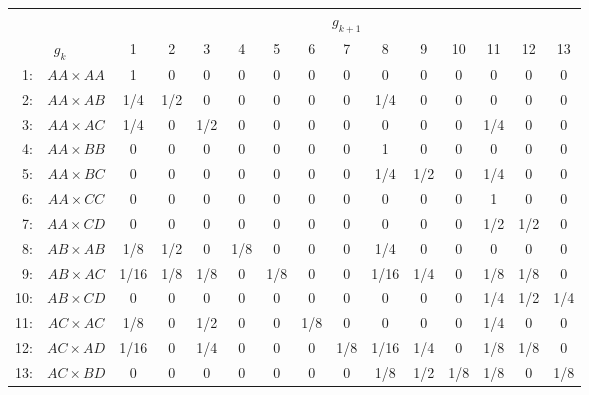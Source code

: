 \begin{center}
\begin{tabular}{rc@{\hspace{10mm}}ccccccccccccc} \hline
 && \multicolumn{13}{c}{$g_{k+1}$} \\ \cline{3-15}
\multicolumn{2}{c}{$g_k$}  & 1 & 2 & 3 & 4 & 5 & 6 & 7 & 8 & 9 & 10 & 11 & 12 & 13\\ \hline
1: & $AA \times AA$ & 1 & 0 & 0 & 0 & 0 & 0 & 0 & 0 & 0 & 0 & 0 & 0 & 0 \\ 
2: & $AA \times AB$ & 1/4 & 1/2 & 0 & 0 & 0 & 0 & 0 & 1/4 & 0 & 0 & 0 & 0 & 0 \\ 
3: & $AA \times AC$ & 1/4 & 0 & 1/2 & 0 & 0 & 0 & 0 & 0 & 0 & 0 & 1/4 & 0 & 0 \\ 
4: & $AA \times BB$ & 0 & 0 & 0 & 0 & 0 & 0 & 0 & 1 & 0 & 0 & 0 & 0 & 0 \\ 
5: & $AA \times BC$ & 0 & 0 & 0 & 0 & 0 & 0 & 0 & 1/4 & 1/2 & 0 & 1/4 & 0 & 0 \\ 
6: & $AA \times CC$ & 0 & 0 & 0 & 0 & 0 & 0 & 0 & 0 & 0 & 0 & 1 & 0 & 0 \\ 
7: & $AA \times CD$ & 0 & 0 & 0 & 0 & 0 & 0 & 0 & 0 & 0 & 0 & 1/2 & 1/2 & 0 \\ 
8: & $AB \times AB$ & 1/8 & 1/2 & 0 & 1/8 & 0 & 0 & 0 & 1/4 & 0 & 0 & 0 & 0 & 0 \\ 
9: & $AB \times AC$ & 1/16 & 1/8 & 1/8 & 0 & 1/8 & 0 & 0 & 1/16 & 1/4 & 0 & 1/8 & 1/8 & 0 \\ 
10: & $AB \times CD$ & 0 & 0 & 0 & 0 & 0 & 0 & 0 & 0 & 0 & 0 & 1/4 & 1/2 & 1/4 \\ 
11: & $AC \times AC$ & 1/8 & 0 & 1/2 & 0 & 0 & 1/8 & 0 & 0 & 0 & 0 & 1/4 & 0 & 0 \\ 
12: & $AC \times AD$ & 1/16 & 0 & 1/4 & 0 & 0 & 0 & 1/8 & 1/16 & 1/4 & 0 & 1/8 & 1/8 & 0 \\ 
13: & $AC \times BD$ & 0 & 0 & 0 & 0 & 0 & 0 & 0 & 1/8 & 1/2 & 1/8 & 1/8 & 0 & 1/8 \\ 
\hline
\end{tabular}
\end{center}

